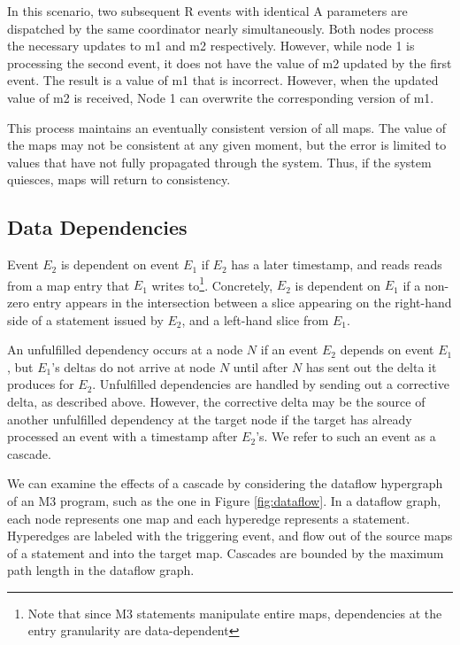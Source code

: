 \documentclass{vldb}
\begin{document}
In this scenario, two subsequent R events with identical A parameters are dispatched by the same coordinator nearly simultaneously.  Both nodes process the necessary updates to m1 and m2 respectively.  However, while node 1 is processing the second event, it does not have the value of m2 updated by the first event.  The result is a value of m1 that is incorrect.  However, when the updated value of m2 is received, Node 1 can overwrite the corresponding version of m1.  

This process maintains an eventually consistent version of all maps.  The value of the maps may not be consistent at any given moment, but the error is limited to values that have not fully propagated through the system.  Thus, if the system quiesces, maps will return to consistency.

\subsection{Data Dependencies}
Event $E_2$ is dependent on event $E_1$ if $E_2$ has a later timestamp, and reads reads from a map entry that $E_1$ writes to\footnote{Note that since M3 statements manipulate entire maps, dependencies at the entry granularity are data-dependent}.  Concretely, $E_2$ is dependent on $E_1$ if a non-zero entry appears in the intersection between a slice appearing on the right-hand side of a statement issued by $E_2$, and a left-hand slice from $E_1$.  

An unfulfilled dependency occurs at a node $N$ if an event $E_2$ depends on event $E_1$, but $E_1$'s deltas do not arrive at node $N$ until after $N$ has sent out the delta it produces for $E_2$.  Unfulfilled dependencies are handled by sending out a corrective delta, as described above.  However, the corrective delta may be the source of another unfulfilled dependency at the target node if the target has already processed an event with a timestamp after $E_2$'s.  We refer to such an event as a cascade.

We can examine the effects of a cascade by considering the dataflow hypergraph of an M3 program, such as the one in Figure \ref{fig:dataflow}.  In a dataflow graph, each node represents one map and each hyperedge represents a statement.  Hyperedges are labeled with the triggering event, and flow out of the source maps of a statement and into the target map.  Cascades are bounded by the maximum path length in the dataflow graph. 
\end{document}
